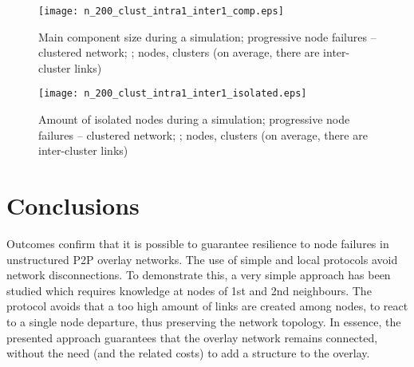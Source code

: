 \documentclass{www13-companion-accepted}
\begin{document}
\begin{figure}[thbp]
   \centering
   \texttt{[image: n\_200\_clust\_intra1\_inter1\_comp.eps]}
\caption{Main component size during a simulation; progressive node failures -- clustered network; ;  nodes,  clusters (on average, there are  inter-cluster links)}
   \label{fig:cluster_comp}
\end{figure}

\begin{figure}[thbp]
   \centering
   \texttt{[image: n\_200\_clust\_intra1\_inter1\_isolated.eps]}
\caption{Amount of isolated nodes during a simulation; progressive node failures -- clustered network; ;  nodes,  clusters (on average, there are  inter-cluster links)}
   \label{fig:cluster_isol}
\end{figure}


\section{Conclusions}\label{sec:conc}

Outcomes confirm that it is possible to guarantee resilience to node failures in unstructured P2P overlay networks. The use of simple and local protocols avoid network disconnections. 
To demonstrate this, a very simple approach has been studied which requires knowledge at nodes of 1st and 2nd neighbours. The protocol avoids that a too high amount of links are created among nodes, to react to a single node departure, thus preserving the network topology.
In essence, the presented approach guarantees that the overlay network remains connected, without the need (and the related costs) to add a structure to the overlay.



\def\newblock{}
\end{document}
